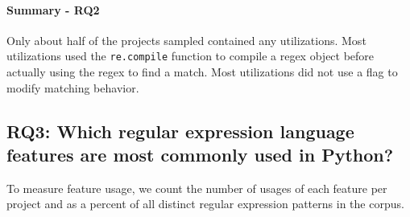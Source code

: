 

% 


\paragraph{Summary - RQ2}

Only about half of the projects sampled contained any utilizations.  Most utilizations used the {\tt re.compile} function to compile a regex object before actually using the regex to find a match.  Most utilizations did not use a flag to modify matching behavior.





\subsection{RQ3: Which regular expression language features are most commonly used in Python?}
\label{results:rq3}

To measure feature usage, we  count the number of usages of each feature per project and as a percent of all distinct regular expression patterns in the corpus.



